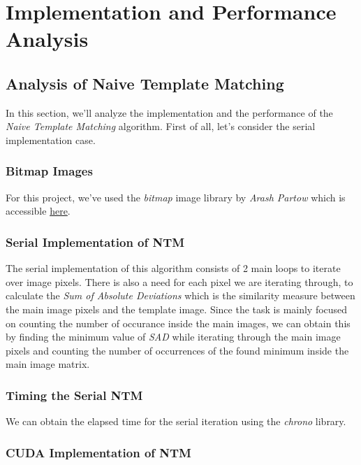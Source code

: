 \chapter{Implementation and Performance Analysis}

\section{Analysis of Naive Template Matching}
In this section, we'll analyze the implementation and the performance of the \textit{Naive Template Matching} algorithm. First of all, let's consider the serial implementation case. 

\subsection{Bitmap Images}
For this project, we've used the \textit{bitmap} image library by \textit{Arash Partow} which is accessible \href{https://github.com/ArashPartow/bitmap}{here}.

\subsection{Serial Implementation of NTM}
The serial implementation of this algorithm consists of 2 main loops to iterate over image pixels. There is also a need for each pixel we are iterating through, to calculate the \textit{Sum of Absolute Deviations} which is the similarity measure between the main image pixels and the template image. Since the task is mainly focused on counting the number of occurance inside the main images, we can obtain this by finding the minimum value of \textit{SAD} while iterating through the main image pixels and counting the number of occurrences of the found minimum inside the main image matrix.

\subsection{Timing the Serial NTM}
We can obtain the elapsed time for the serial iteration using the \textit{chrono} library.

\subsection{CUDA Implementation of NTM}

